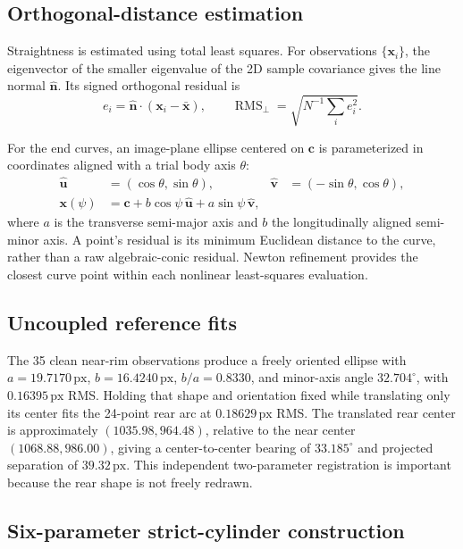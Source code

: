 \documentclass[11pt,letterpaper]{article}
\newcommand{\rms}{\operatorname{RMS}}
\newcommand{\px}{\,\mathrm{px}}
\newcommand{\mat}[1]{\mathbf{#1}}
\begin{document}
\subsection{Orthogonal-distance estimation}

Straightness is estimated using total least squares. For observations \(\{\mat x_i\}\), the eigenvector of the smaller eigenvalue of the 2D sample covariance gives the line normal \(\hat{\mat n}\). Its signed orthogonal residual is
\begin{equation}
 e_i=\hat{\mat n}\cdot(\mat x_i-\bar{\mat x}),\qquad
 \rms_{\perp}=\sqrt{N^{-1}\sum_i e_i^2}.
\end{equation}

For the end curves, an image-plane ellipse centered on \(\mat c\) is parameterized in coordinates aligned with a trial body axis \(\theta\):
\begin{align}
 \hat{\mat u}&=(\cos\theta,\sin\theta), &
 \hat{\mat v}&=(-\sin\theta,\cos\theta),\\
 \mat x(\psi)&=\mat c+b\cos\psi\,\hat{\mat u}
 +a\sin\psi\,\hat{\mat v},
 \label{eq:ellipse}
\end{align}
where \(a\) is the transverse semi-major axis and \(b\) the longitudinally aligned semi-minor axis. A point's residual is its minimum Euclidean distance to the curve, rather than a raw algebraic-conic residual. Newton refinement provides the closest curve point within each nonlinear least-squares evaluation.

\subsection{Uncoupled reference fits}

The 35 clean near-rim observations produce a freely oriented ellipse with \(a=19.7170\px\), \(b=16.4240\px\), \(b/a=0.8330\), and minor-axis angle \(32.704^\circ\), with \(0.16395\px\) RMS. Holding that shape and orientation fixed while translating only its center fits the 24-point rear arc at \(0.18629\px\) RMS. The translated rear center is approximately \((1035.98,964.48)\), relative to the near center \((1068.88,986.00)\), giving a center-to-center bearing of \(33.185^\circ\) and projected separation of \(39.32\px\). This independent two-parameter registration is important because the rear shape is not freely redrawn.

\subsection{Six-parameter strict-cylinder construction}
\label{sec:strict}
\end{document}
